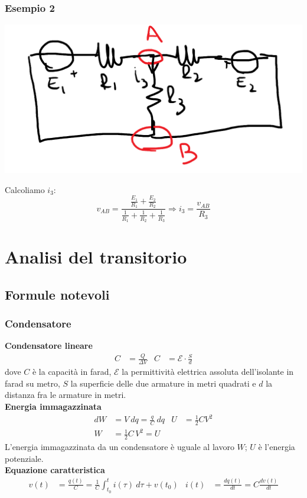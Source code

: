 \documentclass{article}
\begin{document}
\subsubsection{Esempio 2}
\begin{center}
    \includegraphics[scale=0.3]{Image/Es_Millman_2.png}
\end{center}
Calcoliamo $i_3$:
\[
    v_{AB} = \frac{\frac{E_1}{R_1}+\frac{E_2}{R_2}}{\frac{1}{R_1}+\frac{1}{R_2}+\frac{1}{R_3}} \Rightarrow i_3 = \frac{v_{AB}}{R_3}
\]




\section{Analisi del transitorio}

\subsection{Formule notevoli}
\subsubsection{Condensatore}
\textbf{Condensatore lineare}
\begin{align*}
    C&=\frac{Q}{\Delta V} & C &= \mathcal{E} \cdot \frac{S}{d}
\end{align*}
dove $C$ è la capacità in farad,  $\mathcal{E}$ la permittività elettrica assoluta dell'isolante in farad su metro, $S$ la superficie delle due armature in metri quadrati e $d$ la distanza fra le armature in metri. 
\vspace*{0.2cm}\\
\textbf{Energia immagazzinata}
\begin{align*}
    dW &= V \ dq = \frac{q}{C} \ dq & U &= \frac{1}{2} CV^2 \\
    W&={\frac {1}{2}}C\,V^{2}=U
\end{align*}
L'energia immagazzinata da un condensatore è uguale al lavoro $W$; $U$ è l'energia potenziale.
\vspace*{0.2cm}\\
\textbf{Equazione caratteristica}
\begin{align*}
    v(t) &= \frac{q(t)}{C} = \frac{1}{C} \int_{t_0}^t i(\tau) \ d\tau + v(t_0) & i(t) &= \frac{dq(t)}{dt} = C \frac{dv(t)}{dt}
\end{align*}
\end{document}
